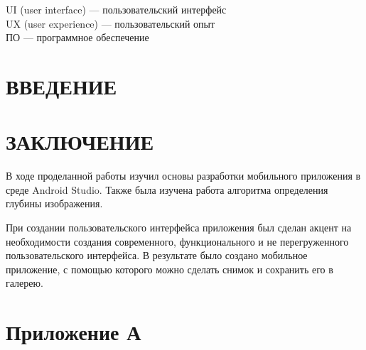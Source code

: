\documentclass[a4paper,12pt]{article}
\begin{document}
UI (user interface) --- пользовательский интерфейс\\
UX (user experience) --- пользовательский опыт\\
ПО –-- программное обеспечение\\



\pagebreak



\tableofcontents

\pagebreak

\section*{\centering ВВЕДЕНИЕ}
\pagebreak

%
\pagebreak
\pagebreak
\pagebreak

\section*{\centering ЗАКЛЮЧЕНИЕ}

В ходе проделанной работы изучил основы разработки мобильного приложения в среде Android Studio. Также была изучена работа алгоритма определения глубины изображения.

При создании пользовательского интерфейса приложения был сделан акцент на необходимости создания современного, функционального и не перегруженного пользовательского интерфейса. В результате  было создано мобильное приложение, с помощью которого можно сделать снимок и сохранить его в галерею.

\pagebreak

\printbibliography

\pagebreak

\section*{ \centering Приложение А} 
\end{document}
